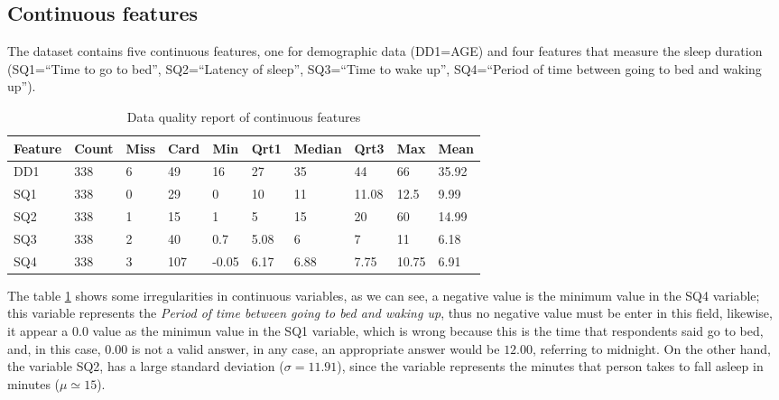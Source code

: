 \documentclass[]{book}
\begin{document}
\subsection{Continuous features}\label{continuous-features}

The dataset contains five continuous features, one for demographic data
(DD1=AGE) and four features that measure the sleep duration (SQ1=``Time
to go to bed'', SQ2=``Latency of sleep'', SQ3=``Time to wake up'',
SQ4=``Period of time between going to bed and waking up'').

\begin{table}[ht]
\centering
\caption{Data quality report of continuous features}
\label{tab:data-quality-report-of-continuous-features}
\begin{tabular}{llllllllll}
\hline
\multicolumn{1}{c}{\textbf{Feature}} & \multicolumn{1}{c}{\textbf{Count}} & \multicolumn{1}{c}{\textbf{Miss}} & \multicolumn{1}{c}{\textbf{Card}} & \multicolumn{1}{c}{\textbf{Min}} & \multicolumn{1}{c}{\textbf{Qrt1}} & \multicolumn{1}{c}{\textbf{Median}} & \multicolumn{1}{c}{\textbf{Qrt3}} & \multicolumn{1}{c}{\textbf{Max}} & \multicolumn{1}{c}{\textbf{Mean}} \\ \hline
DD1   & 338  & 6  & 49  & 16    & 27     & 35    & 44      & 66    & 35.92          \\
SQ1   & 338  & 0  & 29  & 0     & 10     & 11    & 11.08   & 12.5  & 9.99           \\
SQ2   & 338  & 1  & 15  & 1     & 5      & 15    & 20      & 60    & 14.99          \\
SQ3   & 338  & 2  & 40  & 0.7   & 5.08   & 6     & 7       & 11    & 6.18           \\
SQ4   & 338  & 3  & 107 & -0.05 & 6.17   & 6.88  & 7.75    & 10.75 & 6.91           \\ 
\hline
\end{tabular}
\end{table}

The table \ref{tab:data-quality-report-of-continuous-features} shows
some irregularities in continuous variables, as we can see, a negative
value is the minimum value in the SQ4 variable; this variable represents
the \emph{Period of time between going to bed and waking up}, thus no
negative value must be enter in this field, likewise, it appear a
\(0.0\) value as the minimun value in the SQ1 variable, which is wrong
because this is the time that respondents said go to bed, and, in this
case, \(0.00\) is not a valid answer, in any case, an appropriate answer
would be \(12.00\), referring to midnight. On the other hand, the
variable SQ2, has a large standard deviation (\(\sigma=11.91\)), since
the variable represents the minutes that person takes to fall asleep in
minutes (\(\mu\simeq 15\)).
\end{document}
